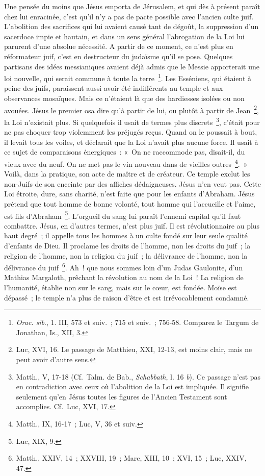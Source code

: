 \documentclass[french,twoside]{book} %
\newcommand\chapterclose{} %
\begin{document}
Une pensée du moins que Jésus emporta de Jérusalem, et qui dès à présent paraît chez lui enracinée, c’est qu’il n’y a pas de pacte possible avec l’ancien culte juif. L’abolition des sacrifices qui lui avaient causé tant de dégoût, la suppression d’un sacerdoce impie et hautain, et dans un sens général l’abrogation de la Loi lui parurent d’une absolue nécessité. A partir de ce moment, ce n’est plus en réformateur juif, c’est en destructeur du judaïsme qu’il se pose. Quelques partisans des idées messianiques avaient déjà admis que le Messie apporterait une loi nouvelle, qui serait commune à toute la terre \footnote{{\itshape Orac. sib}., 1. III, 573 et suiv. ; 715 et suiv. ; 756-58. Comparez le Targum de Jonathan, Is., XII, 3.}. Les Esséniens, qui étaient à peine des juifs, paraissent aussi avoir été indifférents au temple et aux observances mosaïques. Mais ce n’étaient là que des hardiesses isolées ou non avouées. Jésus le premier osa dire qu’à partir de lui, ou plutôt à partir de Jean \footnote{Luc, XVI, 16. Le passage de Matthieu, XXI, 12-13, est moins clair, mais ne peut avoir d’autre sens.}, la Loi n’existait plus. Si quelquefois il usait de termes plus discrets \footnote{ Matth., V, 17-18 (Cf. Talm. de Bab., {\itshape Schabbath}, l. 16 {\itshape b}). Ce passage n’est pas en contradiction avec ceux où l’abolition de la Loi est impliquée. Il signifie seulement qu’en Jésus toutes les figures de l’Ancien Testament sont accomplies. Cf. Luc, XVI, 17.}, c’était pour ne pas choquer trop violemment les préjugés reçus. Quand on le poussait à bout, il levait tous les voiles, et déclarait que la Loi n’avait plus aucune force. Il usait à ce sujet de comparaisons énergiques : « On ne raccommode pas, disait-il, du vieux avec du neuf. On ne met pas le vin nouveau dans de vieilles outres \footnote{Matth., IX, 16-17 ; Luc, V, 36 et suiv.}. » Voilà, dans la pratique, son acte de maître et de créateur. Ce temple exclut les non-Juifs de son enceinte par des affiches dédaigneuses. Jésus n’en veut pas. Cette Loi étroite, dure, sans charité, n’est faite que pour les enfants d’Abraham. Jésus prétend que tout homme de bonne volonté, tout homme qui l’accueille et l’aime, est fils d’Abraham \footnote{Luc, XIX, 9.}. L’orgueil du sang lui paraît l’ennemi capital qu’il faut combattre. Jésus, en d’autres termes, n’est plus juif. Il est révolutionnaire au plus haut degré ; il appelle tous les hommes à un culte fondé sur leur seule qualité d’enfants de Dieu. Il proclame les droits de l’homme, non les droits du juif ; la religion de l’homme, non la religion du juif ; la délivrance de l’homme, non la délivrance du juif \footnote{Matth., XXIV, 14 ; XXVIII, 19 ; Marc, XIII, 10 ; XVI, 15 ; Luc, XXIV, 47.}. Ah ! que nous sommes loin d’un Judas Gaulonite, d’un Mathias Margaloth, prêchant la révolution au nom de la Loi ! La religion de l’humanité, établie non sur le sang, mais sur le cœur, est fondée. Moïse est dépassé ; le temple n’a plus de raison d’être et est irrévocablement condamné.
\chapterclose
\end{document}
